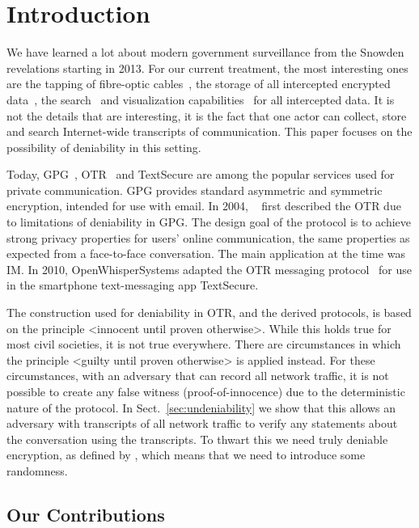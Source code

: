 \acresetall{}
\section{Introduction}

We have learned a lot about modern government surveillance from the Snowden 
revelations starting in 2013.
For our current treatment, the most interesting ones are the tapping of 
fibre-optic cables~\cite{fibretap}, the storage of all intercepted encrypted 
data~\cite{cryptostore}, the search~\cite{xkeyscore} and visualization 
capabilities~\cite{boundlessinformant} for all intercepted data.
It is not the details that are interesting, it is the fact that one actor can 
collect, store and search Internet-wide transcripts of communication.
This paper focuses on the possibility of deniability in this setting.

Today, \ac{GPG}~\cite{gpg}, \ac{OTR}~\cite{otr} and Text\-Secure 
\cite{textsecure} are among the popular services used for private 
communication.
\ac{GPG} provides standard asymmetric and symmetric encryption, intended for 
use with email.
In 2004, \citeauthor{otr2004}~\cite{otr2004} first described the \ac{OTR} due 
to limitations of deniability in \ac{GPG}.
The design goal of the protocol is to achieve strong privacy properties for 
users' online communication, the same properties as expected from 
a face-to-face conversation.
The main application at the time was \ac{IM}.
In 2010, OpenWhisperSystems adapted the \ac{OTR} messaging 
protocol~\cite{frosch2014secure} for use in the smartphone text-messaging app 
TextSecure.

The construction used for deniability in \ac{OTR}, and the derived protocols, 
is based on the principle <innocent until proven otherwise>.
While this holds true for most civil societies, it is not true everywhere.
There are circumstances in which the principle <guilty until proven otherwise> 
is applied instead.
For these circumstances, with an adversary that can record all network traffic, 
it is not possible to create any false witness (proof-of-innocence) due to the 
deterministic nature of the protocol.
In Sect.~\ref{sec:undeniability} we show that this allows an adversary with 
transcripts of all network traffic to verify any statements about the 
conversation using the transcripts.
To thwart this we need truly deniable encryption, as defined by 
\citet{deniablecrypt}, which means that we need to introduce some randomness.

\subsection{Our Contributions}


